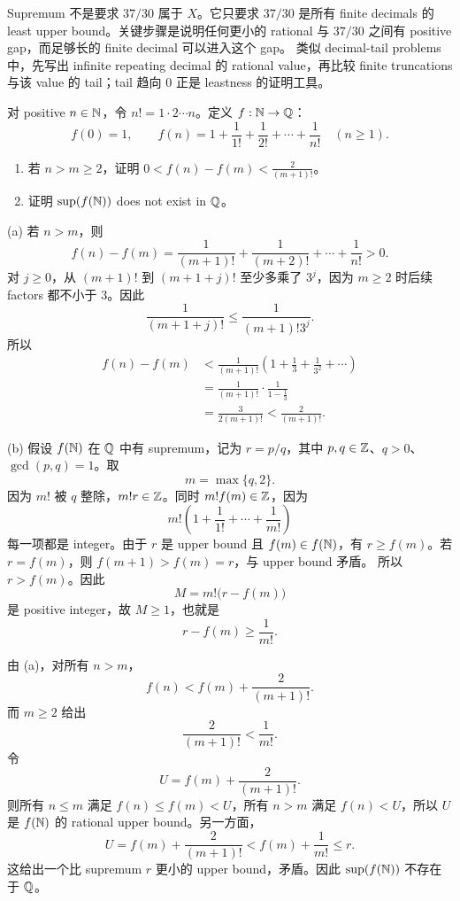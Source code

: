 \begin{explanation}
Supremum 不是要求 \(37/30\) 属于 \(X\)。它只要求 \(37/30\) 是所有 finite
decimals 的 least upper bound。关键步骤是说明任何更小的 rational 与
\(37/30\) 之间有 positive gap，而足够长的 finite decimal 可以进入这个 gap。
类似 decimal-tail problems 中，先写出 infinite repeating decimal 的 rational
value，再比较 finite truncations 与该 value 的 tail；tail 趋向 \(0\) 正是
leastness 的证明工具。
\end{explanation}

\begin{exerciseblock}
对 positive \(n\in\mathbb{N}\)，令 \(n!=1\cdot2\cdots n\)。定义 \(f:\mathbb{N}\to\mathbb{Q}\)：
\[
  f(0)=1,\qquad
  f(n)=1+\frac1{1!}+\frac1{2!}+\cdots+\frac1{n!}\quad(n\geq1).
\]
\begin{enumerate}[label=(\alph*)]
  \item 若 \(n>m\geq2\)，证明 \(0<f(n)-f(m)<\frac{2}{(m+1)!}\)。
  \item 证明 \(\sup(f(\mathbb{N}))\) does not exist in \(\mathbb{Q}\)。
\end{enumerate}
\end{exerciseblock}

\begin{solution}
(a) 若 \(n>m\)，则
\[
  f(n)-f(m)=\frac1{(m+1)!}+\frac1{(m+2)!}+\cdots+\frac1{n!}>0.
\]
对 \(j\geq0\)，从 \((m+1)!\) 到 \((m+1+j)!\) 至少多乘了 \(3^j\)，因为
\(m\geq2\) 时后续 factors 都不小于 \(3\)。因此
\[
  \frac1{(m+1+j)!}\leq \frac1{(m+1)!3^j}.
\]
所以
\[
\begin{aligned}
f(n)-f(m)
  &<\frac1{(m+1)!}\left(1+\frac13+\frac1{3^2}+\cdots\right)\\
  &=\frac1{(m+1)!}\cdot\frac{1}{1-\frac13}\\
  &=\frac{3}{2(m+1)!}
  <\frac{2}{(m+1)!}.
\end{aligned}
\]

(b) 假设 \(f(\mathbb{N})\) 在 \(\mathbb{Q}\) 中有 supremum，记为 \(r=p/q\)，其中
\(p,q\in\mathbb{Z}\)、\(q>0\)、\(\gcd(p,q)=1\)。取
\[
  m=\max\{q,2\}.
\]
因为 \(m!\) 被 \(q\) 整除，\(m!r\in\mathbb{Z}\)。同时 \(m!f(m)\in\mathbb{Z}\)，因为
\[
  m!\left(1+\frac1{1!}+\cdots+\frac1{m!}\right)
\]
每一项都是 integer。由于 \(r\) 是 upper bound 且 \(f(m)\in f(\mathbb{N})\)，有
\(r\geq f(m)\)。若 \(r=f(m)\)，则 \(f(m+1)>f(m)=r\)，与 upper bound 矛盾。
所以 \(r>f(m)\)。因此
\[
  M=m!\bigl(r-f(m)\bigr)
\]
是 positive integer，故 \(M\geq1\)，也就是
\[
  r-f(m)\geq\frac1{m!}.
\]

由 (a)，对所有 \(n>m\)，
\[
  f(n)<f(m)+\frac{2}{(m+1)!}.
\]
而 \(m\geq2\) 给出
\[
  \frac{2}{(m+1)!}<\frac1{m!}.
\]
令
\[
  U=f(m)+\frac{2}{(m+1)!}.
\]
则所有 \(n\leq m\) 满足 \(f(n)\leq f(m)<U\)，所有 \(n>m\) 满足 \(f(n)<U\)，所以
\(U\) 是 \(f(\mathbb{N})\) 的 rational upper bound。另一方面，
\[
  U=f(m)+\frac{2}{(m+1)!}
  <f(m)+\frac1{m!}
  \leq r.
\]
这给出一个比 supremum \(r\) 更小的 upper bound，矛盾。因此
\(\sup(f(\mathbb{N}))\) 不存在于 \(\mathbb{Q}\)。
\end{solution}

